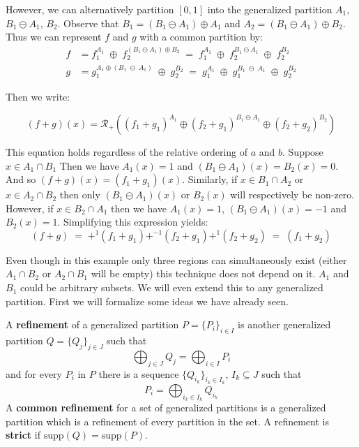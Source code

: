 However, we can alternatively partition $[0,1]$ into the generalized partition $A_1$, $B_1 \ominus A_1$, $B_2$.
Observe that $B_1 = (B_1 \ominus A_1) \oplus A_1$ and $A_2 = (B_1 \ominus A_1) \oplus B_2$.
Thus we can represent $f$ and $g$ with a common partition by:
\begin{align}
	f &=  f_1^{A_1} \;\oplus\; f_2^{(B_1 \ominus A_1) \oplus B_2}
		\;=\; f_1^{A_1} \;\oplus\; f_2^{B_1 \ominus A_1} \;\oplus\; f_2^{B_2} \\
	g &= g_1^{A_1 \oplus (B_1 \;\ominus\; A_1)} \;\oplus\; g_2^{B_2}
		\;=\; g_1^{A_1} \;\oplus\; g_1^{B_1 \;\ominus\; A_1} \;\oplus\; g_2^{B_2}
\end{align}

Then we write:

\begin{equation}
	(f+g)(x) = \mathcal{R}_+ \left( (f_1 + g_1)^{A_1} 
			\oplus (f_2 + g_1)^{B_1 \ominus A_1} 
			\oplus (f_2 + g_2)^{B_2} \right)
\end{equation}


This equation holds regardless of the relative ordering of $a$ and $b$.
Suppose $x \in A_1 \cap B_1$
Then we have $A_1(x)= 1$ and $(B_1 \ominus A_1)(x) = B_2(x) = 0$.
And so $(f+g)(x) = (f_1 + g_1)(x)$.
Similarly, if $x \in B_1 \cap A_2$ or $x \in A_2 \cap B_2$ then 
only $(B_1 \ominus A_1)(x)$ or $B_2(x)$ will respectively be non-zero.
However, if $x \in B_2 \cap A_1$ then we have $A_1(x) = 1$, $(B_1 \ominus A_1)(x) = -1$ and $B_2(x) = 1$.
Simplifying this expression yields:
\begin{equation}
	(f+g) \;=\; +^1 (f_1 + g_1) +^{-1} (f_2 + g_1) +^1 (f_2 + g_2) \;=\; (f_1 + g_2)
\end{equation}


Even though in this example only three regions can simultaneously exist 
(either $A_1 \cap B_2$ or $A_2 \cap B_1$ will be empty)
 this technique does not depend on it.
$A_1$ and $B_1$ could be arbitrary subsets.
We will even extend this to any generalized partition.
First we will formalize some ideas we have already seen.


\begin{definition}
	A \textbf{refinement} of a generalized partition $P = \{P_i\}_{i \in I}$ is another generalized partition
	$Q = \{Q_j \}_{j \in J}$ such that 
	\begin{equation}
		\bigoplus_{j \in J} Q_j = \bigoplus_{i \in I} P_i
	\end{equation}
	and for every $P_i$ in $P$ there is a sequence $\{ Q_{i_k} \}_{i_k \in I_k}$, $I_k \subseteq J$ such that 
	\begin{equation}
		P_i = \bigoplus_{i_k \in I_k} Q_{i_k}
	\end{equation}
	A \textbf{common refinement} for a set of generalized partitions is a generalized partition which is a 
	refinement of every partition in the set. 
	A refinement is \textbf{strict} if $\text{supp}(Q) = \text{supp}(P)$.
\end{definition}


